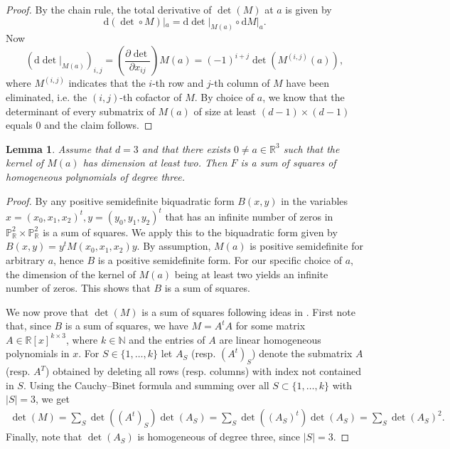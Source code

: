\documentclass[a4paper,10pt]{amsart}
\theoremstyle{definition}
\theoremstyle{plain}
\newtheorem{lem}[Def]{Lemma}
\newcommand{\R}{{\mathbb R}}
\newcommand{\pp}{\mathbb{P}}
\newcommand{\N}{{\mathbb N}}
\begin{document}
\begin{proof}
 By the chain rule, the total derivative of $\det(M)$ at $a$ is given by
 \begin{equation*}
     \textrm{d}(\det \circ M)|_a = \textrm{d}\det|_{M(a)} \circ \textrm{d}M|_a.
 \end{equation*}
 Now
 \begin{equation*}
     (\textrm{d} \det|_{M(a)})_{i,j} = \left(\frac{\partial \det}{\partial x_{ij}}\right) M(a) = (-1)^{i+j}\det(M^{(i,j)}(a)),
 \end{equation*}
 where $M^{(i,j)}$ indicates that the $i$-th row and $j$-th column of $M$ have been eliminated, i.e. the $(i,j)$-th cofactor of $M$. By choice of $a$, we know that the determinant of every submatrix of $M(a)$ of size at least $(d-1)\times(d-1)$ equals $0$ and the claim follows.
\end{proof}

\begin{lem}\label{lem:kereal}
 Assume that $d=3$ and that there exists $0\neq a\in\R^3$ such that the kernel of $M(a)$ has dimension at least two. Then $F$ is a sum of squares of homogeneous polynomials of degree three.
\end{lem}

\begin{proof}
 By \cite[Theorem 4.4]{quarez} any positive semidefinite biquadratic form $B(x,y)$ in the variables $x=(x_0,x_1,x_2)^t, y=(y_0,y_1,y_2)^t$ that has an infinite number of zeros in $\pp^2_\R \times \pp^2_\R$ is a sum of squares. We apply this to the biquadratic form given by $B(x,y)=y^tM(x_0,x_1,x_2)y$. By assumption, $M(a)$ is positive semidefinite for arbitrary $a$, hence $B$ is a positive semidefinite form. For our specific choice of $a$, the dimension of the kernel of $M(a)$ being at least two yields an infinite number of zeros. This shows that $B$ is a sum of squares.
 
 We now prove that $\det(M)$ is a sum of squares following ideas in \cite[Proposition 5.6]{quarez}. First note that, since $B$ is a sum of squares, we have $M=A^tA$ for some matrix $A \in \R[x]^{k \times 3}$, where $k \in \N$ and the entries of $A$ are linear homogeneous polynomials in $x$. For $S \in \{1, \dots, k\}$ let $A_S$ (resp. $(A^t)_S$) denote the submatrix $A$ (resp. $A^T$) obtained by deleting all rows (resp. columns) with index not contained in $S$. Using the Cauchy--Binet formula and summing over all $S \subset \{1,\dots, k\}$ with $|S| = 3$, we get
 \begin{align*}
     \det(M) = \sum_{S} \det((A^t)_S) \det(A_S) = \sum_{S} \det((A_S)^t) \det(A_S) = \sum_{S} \det(A_S)^2.
 \end{align*}
 Finally, note that $\det(A_S)$ is homogeneous of degree three, since $|S| = 3$.
\end{proof}
\end{document}
